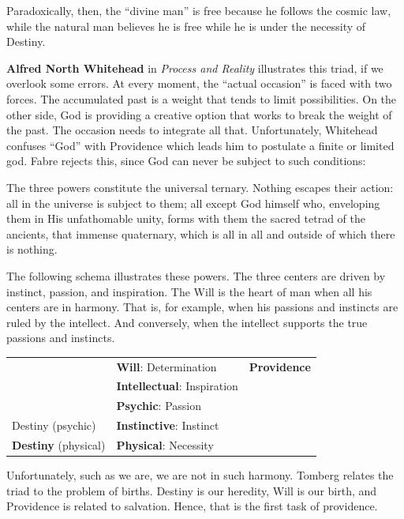 Paradoxically, then, the ``divine man'' is free because he follows the cosmic law, while the natural man believes he is free while he is under the necessity of Destiny.

\textbf{Alfred North Whitehead} in \emph{Process and Reality} illustrates this triad, if we overlook some errors. At every moment, the ``actual occasion'' is faced with two forces. The accumulated past is a weight that tends to limit possibilities. On the other side, God is providing a creative option that works to break the weight of the past. The occasion needs to integrate all that. Unfortunately, Whitehead confuses ``God'' with Providence which leads him to postulate a finite or limited god. Fabre rejects this, since God can never be subject to such conditions:

\begin{quotex}
The three powers constitute the universal ternary. Nothing escapes their action: all in the universe is subject to them; all except God himself who, enveloping them in His unfathomable unity, forms with them the sacred tetrad of the ancients, that immense quaternary, which is all in all and outside of which there is nothing.
\end{quotex}


The following schema illustrates these powers. The three centers are driven by instinct, passion, and inspiration. The Will is the heart of man when all his centers are in harmony. That is, for example, when his passions and instincts are ruled by the intellect. And conversely, when the intellect supports the true passions and instincts.

\begin{table}[h]\small\centering
\begin{tabular}{p{}p{}p{}}
\toprule
~ & \textbf{Will}: Determination & \textbf{Providence} \\
~ & \textbf{Intellectual}: Inspiration & ~ \\
~ & \textbf{Psychic}: Passion & ~ \\
Destiny (psychic) & \textbf{Instinctive}: Instinct & ~ \\
\textbf{Destiny} (physical) & \textbf{Physical}: Necessity & ~ \\\bottomrule
\end{tabular}
\end{table}

Unfortunately, such as we are, we are not in such harmony. Tomberg relates the triad to the problem of births. Destiny is our heredity, Will is our birth, and Providence is related to salvation. Hence, that is the first task of providence.

